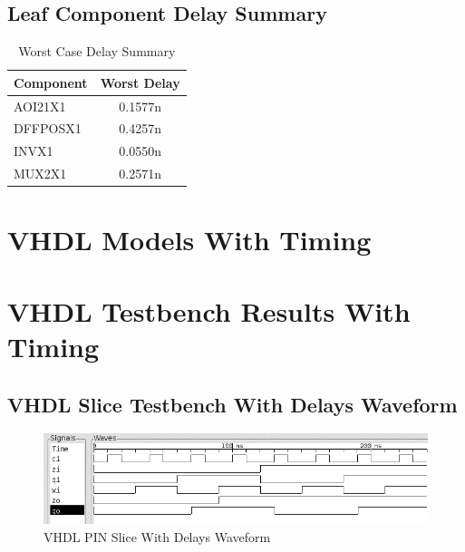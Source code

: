     \subsection{Leaf Component Delay Summary}

        \begin{table}[H]
            \centering
            \begin{tabular}{lc}
                \toprule
                \textbf{Component} & \textbf{Worst Delay} \\
                \midrule
                AOI21X1  & 0.1577n \\
                DFFPOSX1 & 0.4257n \\
                INVX1    & 0.0550n \\
                MUX2X1   & 0.2571n \\
                \bottomrule
            \end{tabular}
            \caption{Worst Case Delay Summary}
        \end{table}

\newpage
\section{VHDL Models With Timing}
    
    
    
    
\section{VHDL Testbench Results With Timing}

    \subsection{VHDL Slice Testbench With Delays Waveform}

        \begin{figure}[H]
            \centering
            \includegraphics[width=\linewidth]{../../doc/vhdl_sim_pics/pin_slice_with_delays.png}
            \caption{VHDL PIN Slice With Delays Waveform}
        \end{figure}

